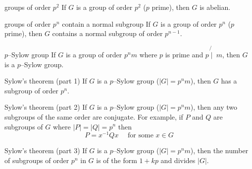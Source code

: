 \documentclass[avery5371,grid]{flashcards}
\begin{document}
\begin{flashcard}[Theorem]{groups of order $p^{2}$}
If $G$ is a group of order $p^{2}$ ($p$ prime), then $G$ is abelian.
\end{flashcard}

\begin{flashcard}[Theorem]{groups of order $p^{n}$ contain a normal 
subgroup}
If $G$ is a group of order $p^{n}$ ($p$ prime), then $G$ contains
a normal subgroup of order $p^{n-1}$.
\end{flashcard}

\begin{flashcard}[Definition]{$p$--Sylow group}
If $G$ is a group of order $p^{n}m$ where $p$ is prime and 
$p \not{\mid} \: m$, then $G$ is a $p$--Sylow group.
\end{flashcard}

\begin{flashcard}[Theorem]{Sylow's theorem (part 1)}
If $G$ is a $p$--Sylow group ($|G| = p^{n}m$),
then $G$ has a subgroup of order $p^{n}$.
\end{flashcard}

\begin{flashcard}[Theorem]{Sylow's theorem (part 2)}
If $G$ is a $p$--Sylow group ($|G| = p^{n}m$), then any 
two subgroups of the same order are conjugate.  For example,
if $P$ and $Q$ are subgroups of $G$ where $|P|=|Q|=p^{n}$ then
\begin{equation*}
P = x^{-1}Qx \quad \text{ for some } x \in G
\end{equation*}
\end{flashcard}

\begin{flashcard}[Theorem]{Sylow's theorem (part 3)}
If $G$ is a $p$--Sylow group ($|G| = p^{n}m$),
then the number of subgroups of order $p^{n}$ in $G$ is
of the form $1 + kp$ and divides $|G|$.
\end{flashcard}
\end{document}
